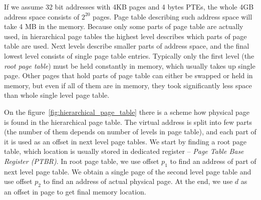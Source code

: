 If we assume 32 bit addresses with 4KB pages and 4 bytes PTEs, the whole 4GB address space consists of \(2^{20}\) pages.
Page table describing such address space will take 4 MB in the memory.
Because only some parts of page table are actually used, in hierarchical page tables the highest level describes which parts of page table are used.
Next levels describe smaller parts of address space, and the final lowest level consists of single page table entries.
Typically only the first level (the {\it root page table}) must be held constantly in memory, which usually takes up single page.
Other pages that hold parts of page table can either be swapped or held in memory, but even if all of them are in memory,
they took significantly less space than whole single level page table.

On the figure~\ref{fig:hierarchical_page_table} there is a scheme how physical page is found in the hierarchical page table.
The virtual address is split into few parts (the number of them depends on number of levels in page table),
and each part of it is used as an offset in next level page tables.
We start by finding a root page table, which location is usually stored in dedicated register -- {\it Page Table Base Register (PTBR)}.
In root page table, we use offset \(p_1\) to find an address of part of next level page table.
We obtain a single page of the second level page table and use offset \(p_2\) to find an address of actual physical page.
At the end, we use \(d\) as an offset in page to get final memory location.

%

%

